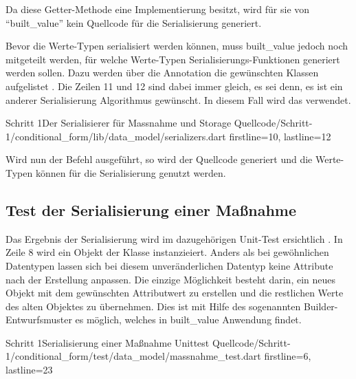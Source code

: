 Da diese Getter-Methode eine Implementierung besitzt, wird für sie von \enquote{built_value} kein Quellcode für die Serialisierung generiert.

Bevor die Werte-Typen serialisiert werden können, muss built_value jedoch noch mitgeteilt werden, für welche Werte-Typen Serialisierungs-Funktionen generiert werden sollen. Dazu werden über die Annotation  die gewünschten Klassen aufgelistet . Die Zeilen 11 und 12 sind dabei immer gleich, es sei denn, es ist ein anderer Serialisierung Algorithmus gewünscht. In diesem Fall wird das verwendet.

\begin{alexlisting}{Schritt 1}{Der Serialisierer für Massnahme und Storage}
  {Quellcode/Schritt-1/conditional_form/lib/data_model/serializers.dart}
  {firstline=10, lastline=12}
  \label{lst:Schritt1Serialisierer}
\end{alexlisting}


Wird nun der Befehl   ausgeführt, so wird der Quellcode generiert und die Werte-Typen können für die Serialisierung genutzt werden.

\subsection{Test der Serialisierung einer Maßnahme}

Das Ergebnis der Serialisierung wird im dazugehörigen Unit-Test ersichtlich \Lst{\ref{lst:SerialisierungEinerMassnahmeUnittest}}.
In Zeile 8 wird ein Objekt der Klasse  instanzieiert. Anders als bei gewöhnlichen Datentypen lassen sich bei diesem unveränderlichen Datentyp keine Attribute nach der Erstellung anpassen. Die einzige Möglichkeit besteht darin, ein neues Objekt  mit dem gewünschten Attributwert zu erstellen und die restlichen Werte des alten Objektes zu übernehmen. Dies ist mit Hilfe des sogenannten Builder-Entwurfsmuster es möglich, welches in built_value Anwendung findet.

\begin{alexlisting}{Schritt 1}{Serialisierung einer Maßnahme Unittest}
  {Quellcode/Schritt-1/conditional_form/test/data_model/massnahme_test.dart}
  {firstline=6, lastline=23}
  \label{lst:SerialisierungEinerMassnahmeUnittest}
\end{alexlisting}

